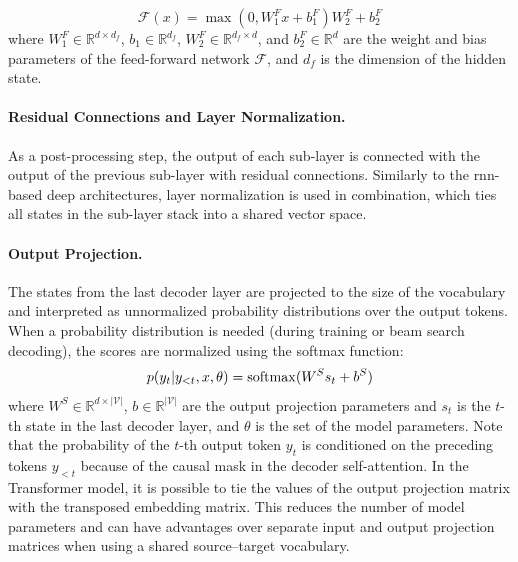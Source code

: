 \begin{equation}
  \mathcal{F}(x) = \max(0, W_1^Fx + b_1^F)W_2^F + b_2^F
\end{equation}
where $W_1^F \in \mathbb{R}^{d \times d_f}$, $b_1 \in \mathbb{R}^{d_f}$,
$W_2^F \in \mathbb{R}^{d_f \times d}$, and $b_2^F \in \mathbb{R}^d$ are the
weight and bias parameters of the feed-forward network $\mathcal{F}$, and $d_f$
is the dimension of the hidden state.

\paragraph{Residual Connections and Layer Normalization.} As a post-processing
step, the output of each sub-layer is connected with the output of the previous
sub-layer with residual connections.  Similarly to the \acs{rnn}-based deep architectures, layer
normalization is used in combination, which ties all states in the sub-layer
stack into a shared vector space.

\paragraph{Output Projection.} The states from the last decoder layer are
projected to the size of the vocabulary and interpreted as unnormalized
probability distributions over the output tokens. When a probability
distribution is needed (during training or beam search decoding), the scores
are normalized using the softmax function:
%
\begin{equation}
  p(y_t | y_{<t}, x, \theta) = \operatorname*{softmax}( W^S s_t + b^S )
\end{equation}
%
where $W^S \in \mathbb{R}^{d \times |\mathcal{V}|}$,
$b \in \mathbb{R}^{|\mathcal{V}|}$ are the output projection parameters and
$s_t$ is the $t$-th state in the last decoder layer, and $\theta$ is the set of
the model parameters. Note that the probability of the $t$-th output token
$y_t$ is conditioned on the preceding tokens $y_{<t}$ because of the causal
mask in the decoder self-attention. In the Transformer model, it is possible to
tie the values of the output projection matrix with the transposed embedding
matrix. This reduces the number of model parameters and can have advantages
over separate input and output projection matrices when using a shared
source--target vocabulary.

